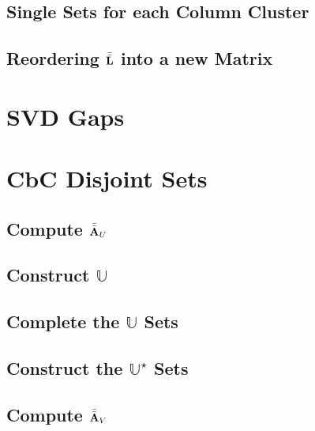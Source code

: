\documentclass[ClusteringConnectionsMAIN.tex]{subfiles}
\begin{document}
\section{Single Sets for each Column Cluster}


\newpage
\section{Reordering $\bar{\bar{\mathbf{L}}}$ into a new Matrix}



%
%
\chapter{SVD Gaps}



%
%
\chapter{CbC Disjoint Sets}


\section{Compute $\bar{\bar{\mathbf{A}}}_U$}


\section{Construct $\mathbb{U}$}


\section{Complete the $\mathbb{U}$ Sets}


\newpage
\section{Construct the $\mathbb{U}^\star$ Sets}


\section{Compute $\bar{\bar{\mathbf{A}}}_V$}

\end{document}
